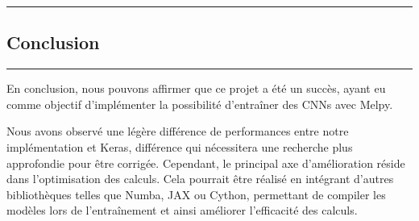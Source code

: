 {\color{gray}\hrule}
\begin{center}
\section{Conclusion}
\bigskip
\end{center}
{\color{gray}\hrule}
\vspace{0.5cm}

En conclusion, nous pouvons affirmer que ce projet a été un succès, ayant eu comme objectif d’implémenter 
la possibilité d’entraîner des CNNs avec Melpy. 

Nous avons observé une légère différence de performances 
entre notre implémentation et Keras, différence qui nécessitera une recherche plus approfondie pour être corrigée. 
Cependant, le principal axe d’amélioration réside dans l’optimisation des calculs. Cela pourrait être réalisé 
en intégrant d’autres bibliothèques telles que Numba, JAX ou Cython, permettant de compiler les modèles lors 
de l’entraînement et ainsi améliorer l’efficacité des calculs. \\